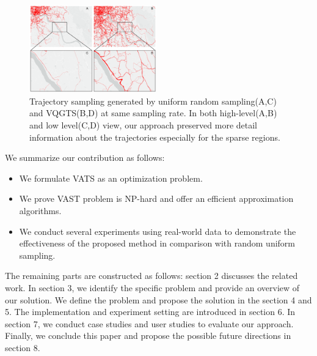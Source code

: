 \begin{figure}[t]
	\centering
	\includegraphics[width=0.49\textwidth]{pictures/introduction/effectiveness.pdf}
	\vspace{-5mm}
	\caption{Trajectory sampling generated by uniform random sampling(A,C) and VQGTS(B,D) at same sampling rate. In both high-level(A,B) and low level(C,D) view, our approach preserved more detail information about the trajectories especially for the sparse regions.}
	\vspace{-5mm}
	\label{fig:compare}
\end{figure}

We summarize our contribution as follows:
\begin{itemize}[noitemsep]
  \item We formulate VATS as an optimization problem.
  \item We prove VAST problem is NP-hard and offer an efficient approximation algorithms. 
  \item We conduct several experiments using real-world data to demonstrate the effectiveness of the proposed method in comparison with random uniform sampling.
\end{itemize}


The remaining parts are constructed as follows: section 2 discusses the related work. In section 3, we identify the specific problem and provide an overview of our solution. We define the problem and propose the solution in the section 4 and 5. The implementation and experiment setting are introduced in section 6. 
In section 7, we conduct case studies and user studies to evaluate our approach. Finally, we conclude this paper and propose the possible future directions in section 8.
